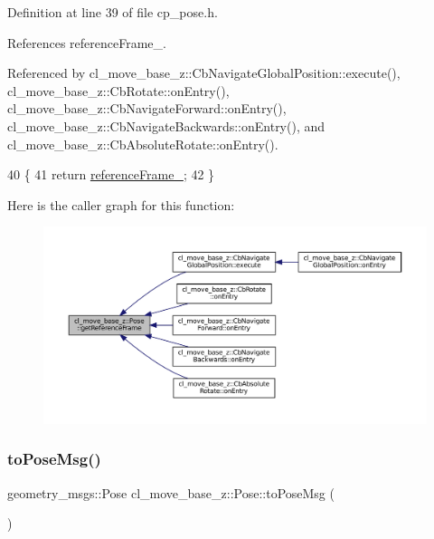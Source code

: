 Definition at line 39 of file cp\+\_\+pose.\+h.



References reference\+Frame\+\_\+.



Referenced by cl\+\_\+move\+\_\+base\+\_\+z\+::\+Cb\+Navigate\+Global\+Position\+::execute(), cl\+\_\+move\+\_\+base\+\_\+z\+::\+Cb\+Rotate\+::on\+Entry(), cl\+\_\+move\+\_\+base\+\_\+z\+::\+Cb\+Navigate\+Forward\+::on\+Entry(), cl\+\_\+move\+\_\+base\+\_\+z\+::\+Cb\+Navigate\+Backwards\+::on\+Entry(), and cl\+\_\+move\+\_\+base\+\_\+z\+::\+Cb\+Absolute\+Rotate\+::on\+Entry().


\begin{DoxyCode}
40     \{
41         \textcolor{keywordflow}{return} \hyperlink{classcl__move__base__z_1_1Pose_a6a7a593232b6edaf99103d48ad8da9d3}{referenceFrame\_};
42     \}
\end{DoxyCode}
Here is the caller graph for this function\+:
\nopagebreak
\begin{figure}[H]
\begin{center}
\leavevmode
\includegraphics[width=350pt]{classcl__move__base__z_1_1Pose_af8c2dc151e74aa8da6b283d1c8563051_icgraph}
\end{center}
\end{figure}
\mbox{\label{classcl__move__base__z_1_1Pose_a9faf8c6b437ff6b19c8bddd692908dca}} 
\subsubsection{\texorpdfstring{to\+Pose\+Msg()}{toPoseMsg()}}
{\footnotesize\ttfamily geometry\+\_\+msgs\+::\+Pose cl\+\_\+move\+\_\+base\+\_\+z\+::\+Pose\+::to\+Pose\+Msg (\begin{DoxyParamCaption}{ }\end{DoxyParamCaption})\hspace{0.3cm}{\ttfamily [inline]}}



